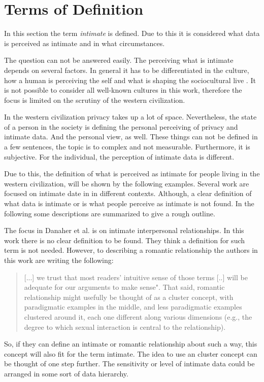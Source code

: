 \section{Terms of Definition}
\label{sec:terms_of_definition}
In this section the term \textit{intimate} is defined. Due to this it is considered what data is perceived as intimate and in what circumstances.

The question can not be answered easily. The perceiving what is intimate depends on several factors.
In general it has to be differentiated in the culture, how a human is perceiving the self and what is shaping the sociocultural live \cite{carrithers1985category}. It is not possible to consider all well-known cultures in this work, therefore the focus is limited on the scrutiny of the western civilization. 

In the western civilization privacy takes up a lot of space. Nevertheless, the state of a person in the society is defining the personal perceiving of privacy and intimate data. And the personal view, as well.
These things can not be defined in a few sentences, the topic is to complex and not measurable. Furthermore, it is subjective. For the individual, the perception of intimate data is different.

Due to this, the definition of what is perceived as intimate for people living in the western civilization, will be shown by the following examples. Several work are focused on intimate date in in different contexts. Although, a clear definition of what data is intimate or is what people perceive as intimate is not found.
In the following some descriptions are summarized to give a rough outline.

The focus in Danaher et al. \cite{doi:10.1080/15265161.2017.1409823} is on intimate interpersonal relationships. In this work there is no clear definition to be found. They think a definition for such term is not needed. However, to describing a romantic relationship the authors in this work are writing the following:

\begin{quote}
	[...] we trust that most readers' intuitive sense of those terms [..] will be adequate for our arguments to make sense". 
	That said, romantic relationship might usefully be thought of as a cluster concept, with paradigmatic examples in the middle, and less paradigmatic examples clustered around it, each one different along various dimensions (e.g., the degree to which sexual interaction is central to the relationship).
\end{quote}

So, if they can define an intimate or romantic relationship about such a way, this concept will also fit for the term intimate. The idea to use an cluster concept can be thought of one step further. The sensitivity or level of intimate data could be arranged in some sort of data hierarchy.